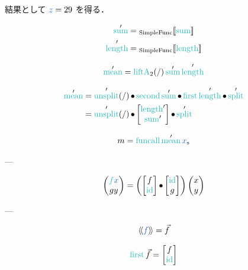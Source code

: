 \documentclass[a5paper,twoside,fleqn,draft]{jsbook}
\def\[{[\![}
\def\]{]\!]}
\def\llangle{\langle\!\langle}
\def\rrangle{\rangle\!\rangle}
\def\varColor{NavyBlue}
\def\funcColor{BlueGreen}
\newcommand{\Langle}{\llangle}
\newcommand{\Rangle}{\rrangle}
\newcommand{\mVar}[1]{\textcolor{\varColor}{#1}}
\newcommand{\mXVar}{\mVar{x}}
\newcommand{\mZVar}{\mVar{z}}
\newcommand{\mFunc}[1]{\textcolor{\funcColor}{#1}}
\newcommand{\mSpecialFunc}[1]{\textcolor{\funcColor}{\textrm{#1}}}
\newcommand{\mFFunc}{{\mFunc{f}}}
\DeclareMathOperator{\mFirst}{\mSpecialFunc{first}}
\DeclareMathOperator{\mFuncall}{\mSpecialFunc{funcall}}
\DeclareMathOperator{\mId}{\mSpecialFunc{id}}
\DeclareMathOperator{\mLength}{\mSpecialFunc{length}}
\DeclareMathOperator{\mLiftATwo}{\mSpecialFunc{liftA}_2}
\DeclareMathOperator{\mMean}{\mSpecialFunc{mean}}
\DeclareMathOperator{\mSecond}{\mSpecialFunc{second}}
\DeclareMathOperator{\mSplit}{\mSpecialFunc{split}}
\DeclareMathOperator{\mSum}{\mSpecialFunc{sum}}
\DeclareMathOperator{\mUnsplit}{\mSpecialFunc{unsplit}}
\DeclareMathOperator{\mCompCat}{\bullet}
\newcommand{\mValueConstructor}[1]{\mathrm{#1}}
\newcommand{\mValueWith}[2]{{}_\mValueConstructor{#1}\[\mVar{#2}\]}
\newcommand{\mArrowWith}[1]{\Langle\mVar{#1}\Rangle}
\newcommand{\mList}[1]{\mVar{#1}_\mathrm{s}}
\newcommand{\mArrow}[1]{\Vec{#1}}
\begin{document}
結果として $\mZVar=29$ を得る．

\begin{align}
  \mSum'
  &=\mValueWith{SimpleFunc}{\mSum}\\
  \mLength'
  &=\mValueWith{SimpleFunc}{\mLength}
\end{align}

\begin{equation}
  \mMean'
  =\mLiftATwo(/)\mSum'\mLength'
\end{equation}

\begin{align}
  \mMean'
  &=\mUnsplit'(/)\mCompCat\mSecond\mSum'\mCompCat\mFirst\mLength'\mCompCat\mSplit'\\
  &=\mUnsplit'(/)\mCompCat\begin{bmatrix}\mLength'\\\mSum'\end{bmatrix}\mCompCat\mSplit'
\end{align}

\begin{equation}
  m
  =\mFuncall\mMean'\mList{x}
\end{equation}


---

\begin{equation}
  \begin{pmatrix}
    \mFFunc\mXVar\\
    gy
  \end{pmatrix}
  =
  \left(
  \begin{bmatrix}
    f\\
    \mId
  \end{bmatrix}
  \mCompCat
  \begin{bmatrix}
    \mId\\
    g
  \end{bmatrix}
  \right)
  \begin{pmatrix}
    x\\
    y
  \end{pmatrix}
\end{equation}

---

\begin{equation}
  \mArrowWith{f}=\mArrow{f}
\end{equation}

\begin{equation}
  \mFirst\mArrow{f}=\begin{bmatrix}f\\\mId\end{bmatrix}
\end{equation}
\end{document}
